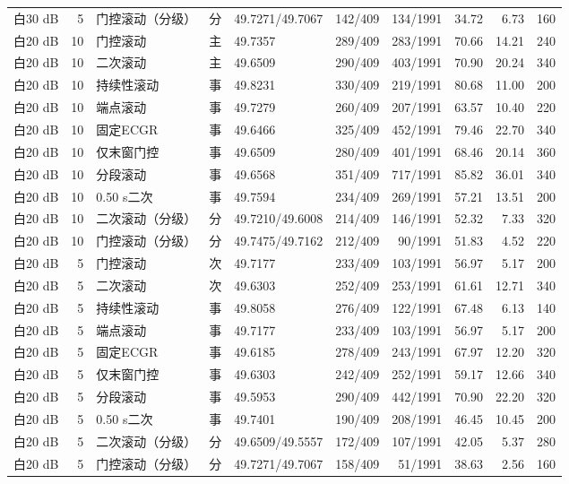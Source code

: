 \documentclass[UTF8,a4paper,11pt]{ctexart}
\begin{document}
\begin{longtable}{lrlclrrrrr}
白30 dB & 5 & 门控滚动（分级） & 分 & 49.7271/49.7067 & 142/409 & 134/1991 & 34.72 & 6.73 & 160 \\
白20 dB & 10 & 门控滚动 & 主 & 49.7357 & 289/409 & 283/1991 & 70.66 & 14.21 & 240 \\
白20 dB & 10 & 二次滚动 & 主 & 49.6509 & 290/409 & 403/1991 & 70.90 & 20.24 & 340 \\
白20 dB & 10 & 持续性滚动 & 事 & 49.8231 & 330/409 & 219/1991 & 80.68 & 11.00 & 200 \\
白20 dB & 10 & 端点滚动 & 事 & 49.7279 & 260/409 & 207/1991 & 63.57 & 10.40 & 220 \\
白20 dB & 10 & 固定ECGR & 事 & 49.6466 & 325/409 & 452/1991 & 79.46 & 22.70 & 340 \\
白20 dB & 10 & 仅末窗门控 & 事 & 49.6509 & 280/409 & 401/1991 & 68.46 & 20.14 & 360 \\
白20 dB & 10 & 分段滚动 & 事 & 49.6568 & 351/409 & 717/1991 & 85.82 & 36.01 & 340 \\
白20 dB & 10 & 0.50 s二次 & 事 & 49.7594 & 234/409 & 269/1991 & 57.21 & 13.51 & 200 \\
白20 dB & 10 & 二次滚动（分级） & 分 & 49.7210/49.6008 & 214/409 & 146/1991 & 52.32 & 7.33 & 320 \\
白20 dB & 10 & 门控滚动（分级） & 分 & 49.7475/49.7162 & 212/409 & 90/1991 & 51.83 & 4.52 & 220 \\
白20 dB & 5 & 门控滚动 & 次 & 49.7177 & 233/409 & 103/1991 & 56.97 & 5.17 & 200 \\
白20 dB & 5 & 二次滚动 & 次 & 49.6303 & 252/409 & 253/1991 & 61.61 & 12.71 & 340 \\
白20 dB & 5 & 持续性滚动 & 事 & 49.8058 & 276/409 & 122/1991 & 67.48 & 6.13 & 140 \\
白20 dB & 5 & 端点滚动 & 事 & 49.7177 & 233/409 & 103/1991 & 56.97 & 5.17 & 200 \\
白20 dB & 5 & 固定ECGR & 事 & 49.6185 & 278/409 & 243/1991 & 67.97 & 12.20 & 320 \\
白20 dB & 5 & 仅末窗门控 & 事 & 49.6303 & 242/409 & 252/1991 & 59.17 & 12.66 & 340 \\
白20 dB & 5 & 分段滚动 & 事 & 49.5953 & 290/409 & 442/1991 & 70.90 & 22.20 & 320 \\
白20 dB & 5 & 0.50 s二次 & 事 & 49.7401 & 190/409 & 208/1991 & 46.45 & 10.45 & 200 \\
白20 dB & 5 & 二次滚动（分级） & 分 & 49.6509/49.5557 & 172/409 & 107/1991 & 42.05 & 5.37 & 280 \\
白20 dB & 5 & 门控滚动（分级） & 分 & 49.7271/49.7067 & 158/409 & 51/1991 & 38.63 & 2.56 & 160 \\

\end{longtable}
\end{document}
